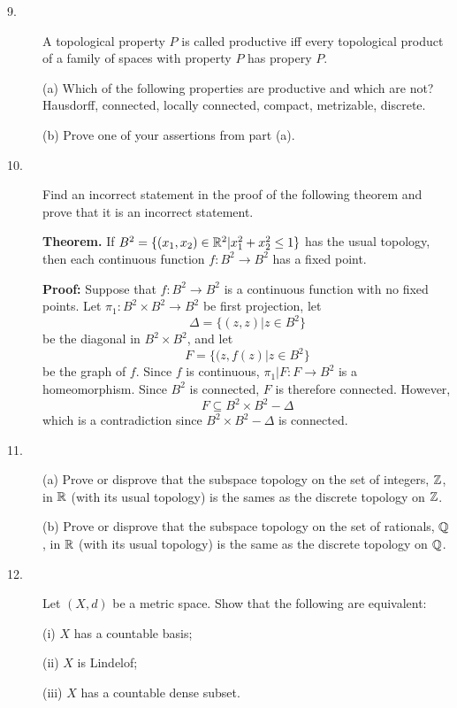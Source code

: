\documentclass{article}
\begin{document}
\begin{description}
\item[9.]
A topological property $P$ is called productive iff every topological
product of a family of spaces with property $P$ has propery $P$.

\item[\quad] (a)
Which of the following properties are productive and which are not? Hausdorff,
connected, locally connected, compact, metrizable, discrete.

\item[\quad] (b)
Prove one of your assertions from part (a).

\item[10.]
Find an incorrect statement in the proof of the following theorem and prove
that it is an incorrect statement.

{\bf Theorem.} If $B^2 = \{(x_1, x_2) \in \Bbb R^2 |x^2_1 + x^2_2 \leq 1\}$
has the usual topology, then each continuous function
$f: B^2 \to B^2$ has a fixed point.

{\bf Proof:}
Suppose that $f:B^2 \to B^2$ is a continuous function with no fixed points.
Let $\pi_1 : B^2 \times B^2 \to B^2$ be first projection, let
$$\Delta = \{(z,z)|z \in B^2\}$$
be the diagonal in $B^2 \times B^2$, and let
$$F= \{(z,f(z)|z \in B^2\}$$
be the graph of $f$. Since $f$ is continuous, $\pi_1 |F:F \to B^2$ is a
homeomorphism. Since $B^2$ is connected, $F$ is therefore connected. However,
$$F \subseteq B^2 \times B^2 - \Delta$$
which is a contradiction since $B^2 \times B^2 - \Delta$ is connected.

\item[11.] (a)
Prove or disprove that the subspace topology on the set of integers, $\Bbb Z$,
in $\Bbb R$ (with its usual topology) is the sames as the discrete topology on
$\Bbb Z$.

\item[\quad] (b)
Prove or disprove that the subspace topology on the set of rationals, $\Bbb Q$,
in $\Bbb R$ (with its usual topology) is the same as the discrete topology on
$\Bbb Q$.

\item[12.]
Let $(X,d)$ be a metric space. Show that the following are equivalent:

\item[\quad] (i)
$X$ has a countable basis;

\item[\quad] (ii)
$X$ is Lindelof;

\item[\quad] (iii)
$X$ has a countable dense subset.


\end{description}
\end{document}
